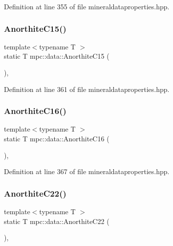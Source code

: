 Definition at line 355 of file mineraldataproperties.\+hpp.

\mbox{\label{namespacempc_1_1data_ac3ef24ff627dcc26c4d87030c5513af9}} 
\subsubsection{\texorpdfstring{Anorthite\+C15()}{AnorthiteC15()}}
{\footnotesize\ttfamily template$<$typename T $>$ \\
static T mpc\+::data\+::\+Anorthite\+C15 (\begin{DoxyParamCaption}{ }\end{DoxyParamCaption})\hspace{0.3cm}{\ttfamily [inline]}, {\ttfamily [static]}}



Definition at line 361 of file mineraldataproperties.\+hpp.

\mbox{\label{namespacempc_1_1data_ada0c7e7ee3acf3998cfaa3a9183c0cae}} 
\subsubsection{\texorpdfstring{Anorthite\+C16()}{AnorthiteC16()}}
{\footnotesize\ttfamily template$<$typename T $>$ \\
static T mpc\+::data\+::\+Anorthite\+C16 (\begin{DoxyParamCaption}{ }\end{DoxyParamCaption})\hspace{0.3cm}{\ttfamily [inline]}, {\ttfamily [static]}}



Definition at line 367 of file mineraldataproperties.\+hpp.

\mbox{\label{namespacempc_1_1data_a14fcfd3f4f6fdb2a23003a3e1b4063f5}} 
\subsubsection{\texorpdfstring{Anorthite\+C22()}{AnorthiteC22()}}
{\footnotesize\ttfamily template$<$typename T $>$ \\
static T mpc\+::data\+::\+Anorthite\+C22 (\begin{DoxyParamCaption}{ }\end{DoxyParamCaption})\hspace{0.3cm}{\ttfamily [inline]}, {\ttfamily [static]}}



